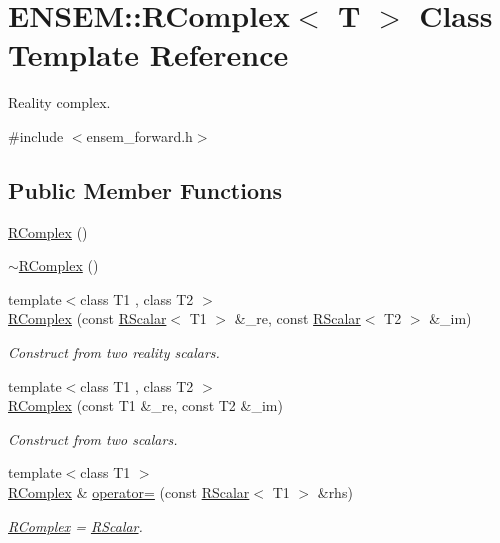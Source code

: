 \hypertarget{classENSEM_1_1RComplex}{}\section{E\+N\+S\+EM\+:\+:R\+Complex$<$ T $>$ Class Template Reference}
\label{classENSEM_1_1RComplex}


Reality complex.  




{\ttfamily \#include $<$ensem\+\_\+forward.\+h$>$}

\subsection*{Public Member Functions}
\begin{DoxyCompactItemize}
\item 
\mbox{\hyperlink{classENSEM_1_1RComplex_a5c5fc0c5c776dc45229f8702053962e5}{R\+Complex}} ()
\item 
\mbox{\hyperlink{classENSEM_1_1RComplex_a6e888c12c12f117dab2c0fd122b7b8d7}{$\sim$\+R\+Complex}} ()
\item 
{\footnotesize template$<$class T1 , class T2 $>$ }\\\mbox{\hyperlink{classENSEM_1_1RComplex_aec74e0e2dcf90ad4b575285662713b9c}{R\+Complex}} (const \mbox{\hyperlink{classENSEM_1_1RScalar}{R\+Scalar}}$<$ T1 $>$ \&\+\_\+re, const \mbox{\hyperlink{classENSEM_1_1RScalar}{R\+Scalar}}$<$ T2 $>$ \&\+\_\+im)
\begin{DoxyCompactList}\small\item\em Construct from two reality scalars. \end{DoxyCompactList}\item 
{\footnotesize template$<$class T1 , class T2 $>$ }\\\mbox{\hyperlink{classENSEM_1_1RComplex_aa67055e36f9e7d7709eb98453901b0ba}{R\+Complex}} (const T1 \&\+\_\+re, const T2 \&\+\_\+im)
\begin{DoxyCompactList}\small\item\em Construct from two scalars. \end{DoxyCompactList}\item 
{\footnotesize template$<$class T1 $>$ }\\\mbox{\hyperlink{classENSEM_1_1RComplex}{R\+Complex}} \& \mbox{\hyperlink{classENSEM_1_1RComplex_a6553ee6381e82a410c0c531fde8e3fee}{operator=}} (const \mbox{\hyperlink{classENSEM_1_1RScalar}{R\+Scalar}}$<$ T1 $>$ \&rhs)
\begin{DoxyCompactList}\small\item\em \mbox{\hyperlink{classENSEM_1_1RComplex}{R\+Complex}} = \mbox{\hyperlink{classENSEM_1_1RScalar}{R\+Scalar}}. \end{DoxyCompactList}\item 

\end{DoxyCompactItemize}
